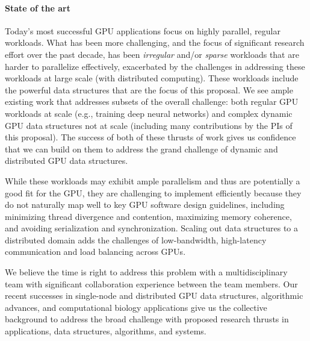 \paragraph{State of the art} Today's most successful GPU applications focus on highly parallel, regular workloads. What has been more challenging, and the focus of significant research effort over the past decade, has been \emph{irregular} and/or \emph{sparse} workloads that are harder to parallelize effectively, exacerbated by the challenges in addressing these workloads at large scale (with distributed computing). These workloads include the powerful data structures that are the focus of this proposal. We see ample existing work that addresses subsets of the overall challenge: both regular GPU workloads at scale (e.g., training deep neural networks) and complex dynamic GPU data structures not at scale (including many contributions by the PIs of this proposal). The success of both of these thrusts of work gives us confidence that we can build on them to address the grand challenge of dynamic and distributed GPU data structures.

While these workloads may exhibit ample parallelism and thus are potentially a good fit for the GPU, they are challenging to implement efficiently because they do not naturally map well to key GPU software design guidelines, including minimizing thread divergence and contention, maximizing memory coherence, and avoiding serialization and synchronization. Scaling out data structures to a distributed domain adds the challenges of low-bandwidth, high-latency communication and load balancing across GPUs.

We believe the time is right to address this problem with a multidisciplinary team with significant collaboration experience between the team members. Our recent successes in single-node and distributed GPU data structures, algorithmic advances, and computational biology applications give us the collective background to address the broad challenge with proposed research thrusts in applications, data structures, algorithms, and systems.

